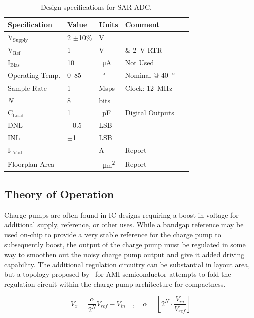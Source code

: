 \documentclass[11pt,letterpaper]{article}
\begin{document}
\begin{table}[ht]
    \centering
    \begin{tabular}{lllll}
    \toprule
        \textbf{Specification} & \textbf{Value} & \textbf{Units} & \textbf{Comment} \\
    \midrule
        \(\mathrm{V_{Supply}}\) & 2 \(\pm\)10\% & V & \\
        \(\mathrm{V_{Ref}}\) & 1 & V & \& \qty{2}{\V} RTR\\
        \(\mathrm{I_{Bias}}\) & 10 & \qty{}{\uA} & Not Used \\
        Operating Temp. & \SIrange{0}{85}{} & \qty{}{\degree\C} & Nominal @ \qty{40}{\degree\C} \\
        Sample Rate & 1 & Msps & Clock: \qty{12}{\MHz} \\
        \(N\) & 8 & bits & \\
        \(\mathrm{C_{Load}}\) & 1 & \qty{}{\pF} & Digital Outputs \\
        DNL & \(\pm\)0.5 & LSB & \\
        INL & \(\pm\)1 & LSB & \\
        \(\mathrm{I_{Total}}\) & --- & A & Report \\
        Floorplan Area & --- & \qty{}{\um\squared} & Report \\
    \bottomrule
    \end{tabular}
    \caption{Design specifications for SAR ADC.}\label{tab:design_req}
\end{table}

\subsection{Theory of Operation}

Charge pumps are often found in IC designs requiring a boost in voltage for additional supply, reference, or other uses. While a bandgap reference may be used on-chip to provide a very stable reference for the charge pump to subsequently boost, the output of the charge pump must be regulated in some way to smoothen out the noisy charge pump output and give it added driving capability. The additional regulation circuitry can be substantial in layout area, but a topology proposed by~\cite{} for AMI semiconductor attempts to fold the regulation circuit within the charge pump architecture for compactness. 

\begin{equation}
    V_x = \frac{\alpha}{2^N}V_{ref} - V_{in} \quad, \quad \alpha = \left\lfloor 2^N \cdot \frac{V_{in}}{V_{ref}} \right\rfloor \label{eq:vx}
\end{equation}
\end{document}
